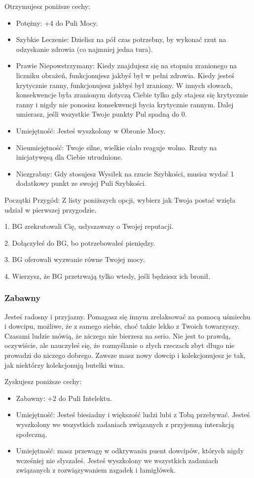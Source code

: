 Otrzymujesz poniższe cechy:
\begin{itemize}
    \item Potężny: +4 do Puli Mocy.
    \item  Szybkie Leczenie: Dzielisz na pół czas potrzebny, by wykonać rzut na odzyskanie zdrowia (co najmniej jedna tura).
    \item  Prawie Niepowstrzymany: Kiedy znajdujesz się na stopniu zranionego na liczniku obrażeń, funkcjonujesz jakbyś był w pełni zdrowia. Kiedy jesteś krytycznie ranny, funkcjonujesz jakbyś był zraniony. W innych słowach, konsekwencje była zranionym dotyczą Ciebie tylko gdy stajesz się krytycznie ranny i nigdy nie ponosisz konsekwencji bycia krytycznie rannym. Dalej umierasz, jeśli wszystkie Twoje punkty Pul spadną do 0.
    \item  Umiejętność: Jesteś wyszkolony w Obronie Mocy.
    \item  Nieumiejętność: Twoje silne, wielkie ciało reaguje wolno. Rzuty na inicjatywęsą dla Ciebie utrudnione.
    \item  Niezgrabny: Gdy stosujesz Wysiłek na rzucie Szybkości, musisz wydać 1 dodatkowy punkt ze swojej Puli Szybkości.
\end{itemize}

Początki Przygód: Z listy poniższych opcji, wybierz jak Twoja postać wzięła udział w pierwszej przygodzie.

1. BG zrekrutowali Cię, usłyszawszy o Twojej reputacji.

2. Dołączyłeś do BG, bo potrzebowałeś pieniędzy.

3. BG oferowali wyzwanie równe Twojej mocy.

4. Wierzysz, że BG przetrwają tylko wtedy, jeśli będziesz ich bronił.

\subsubsection{Zabawny}

Jesteś radosny i przyjazny. Pomagasz się innym zrelaksować za pomocą uśmiechu i dowcipu, możliwe, że z samego siebie, choć także lekko z Twoich towarzyszy.  Czasami ludzie mówią, że niczego nie bierzesz na serio. Nie jest to prawdą, oczywiście, ale nauczyłeś się, że rozmyślanie o złych rzeczach zbyt długo nie prowadzi do niczego dobrego. Zawsze masz nowy dowcip i kolekcjonujesz je tak, jak niektórzy kolekcjonują butelki wina.

Zyskujesz poniższe cechy:
\begin{itemize}
    \item Zabawny: +2 do Puli Intelektu.
    \item  Umiejętność: Jesteś biesiadny i większość ludzi lubi z Tobą przebywać. Jesteś wyszkolony we wszystkich zadaniach związanych z przyjemną interakcją społeczną.
    \item  Umiejętność: masz przewagę w odkrywaniu puent dowcipów, których nigdy wcześniej nie słyszałeś. Jesteś wyszkolony we wszystkich zadaniach związanych z rozwiązywaniem zagadek i łamigłówek.
\end{itemize}

